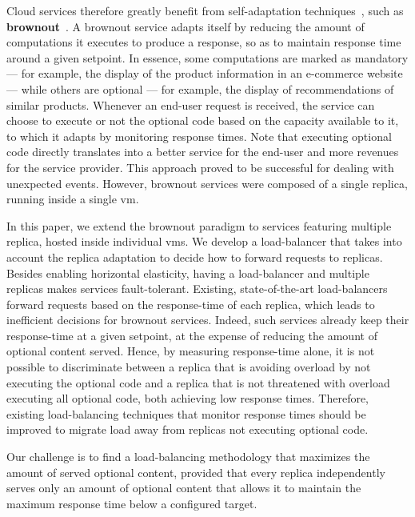 Cloud services therefore greatly benefit from
self-adaptation techniques~\cite{SalehieSelfadaptive:TAAS}, such as
{\bf brownout}~\citep{cloudish-tr}. A brownout service
adapts itself by reducing the amount of computations it executes
to produce a response, so as to maintain response time around a given setpoint.
In essence, some computations are
marked as mandatory --- for example, the display of the product
information in an e-commerce website --- while others are optional ---
for example, the display of recommendations of similar products.
Whenever an end-user request is received, the service can choose to execute
or not the optional code based on the capacity available to it,
to which it adapts by monitoring response times. Note that executing optional code directly
translates into a better service for the end-user and more revenues for
the service provider. This approach proved to be successful for dealing with
unexpected events. However, brownout services were composed
of a single replica, running inside a single \ac{vm}.

In this paper, we extend the brownout paradigm to services featuring
multiple replica, hosted inside individual \acp{vm}. We develop
a load-balancer that takes into account the replica
adaptation to decide how to forward requests to replicas.
Besides enabling horizontal elasticity, having a load-balancer and multiple replicas
makes services fault-tolerant. Existing, state-of-the-art
load-balancers forward requests based on the response-time of each
replica, which leads to inefficient decisions for brownout services.
Indeed, such services already keep their response-time
at a given setpoint, at the expense of reducing the amount of optional
content served. Hence, by measuring response-time alone, it is not possible
to discriminate between a replica that is avoiding overload by not
executing the optional code and a replica that is not threatened with
overload executing all optional code, both achieving low response
times.  Therefore, existing load-balancing techniques that monitor
response times should be improved to migrate load away from replicas
not executing optional code.

Our challenge is to find a load-balancing methodology that maximizes
the amount of served optional content, provided that every replica
independently serves only an amount of optional content that allows it
to maintain the maximum response time below a configured target.

